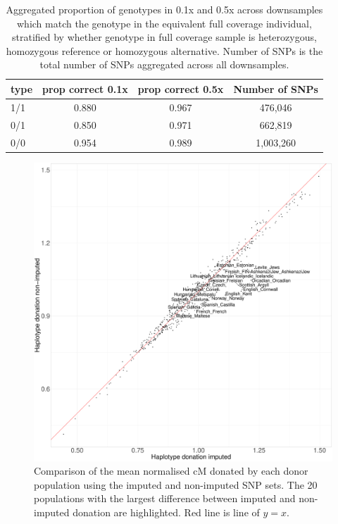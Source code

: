 {\begin{table}
\begin{tabular}[t]{lccc}
\toprule
type & prop correct 0.1x & prop correct 0.5x & Number of SNPs\\
\midrule
1/1 & 0.880 & 0.967 & 476,046\\
0/1 & 0.850 & 0.971 & 662,819\\
0/0 & 0.954 & 0.989 & 1,003,260\\
\bottomrule
\end{tabular}
\caption{Aggregated proportion of genotypes in 0.1x and 0.5x across downsamples which match the genotype in the equivalent full coverage individual, stratified by whether genotype in full coverage sample is heterozygous, homozygous reference or homozygous alternative. Number of SNPs is the total number of SNPs aggregated across all downsamples.}
\endgroup{}
\label{tab:genotype_class_prop}
\end{table}




\begin{figure}[htp]
    \centering
    \includegraphics[width=1.0\textwidth]{../images/chapter1/donation_imputed_nonimputed.pdf}
    \caption{Comparison of the mean normalised cM donated by each donor population using the imputed and non-imputed SNP sets. The 20 populations with the largest difference between imputed and non-imputed donation are highlighted. Red line is line of $y=x$.}
    \label{fig:imputed_nonimputed_donation}
\end{figure}

}
